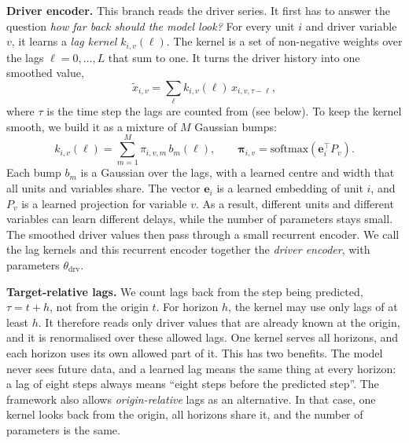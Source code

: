 \documentclass[conference]{IEEEtran}
\begin{document}
\textbf{Driver encoder.} This branch reads the driver series. It first has to answer the question \emph{how far back should the model look?} For every unit $i$ and driver variable $v$, it learns a \emph{lag kernel} $k_{i,v}(\ell)$. The kernel is a set of non-negative weights over the lags $\ell = 0, \dots, L$ that sum to one. It turns the driver history into one smoothed value,
\begin{equation}
\tilde{x}_{i,v} = \sum_{\ell} k_{i,v}(\ell)\, x_{i,v,\tau-\ell}, \label{eq:kernel}
\end{equation}
where $\tau$ is the time step the lags are counted from (see below). To keep the kernel smooth, we build it as a mixture of $M$ Gaussian bumps:
\begin{equation}
k_{i,v}(\ell) = \sum_{m=1}^{M} \pi_{i,v,m}\, b_m(\ell), \qquad
\boldsymbol{\pi}_{i,v} = \mathrm{softmax}\!\left(\mathbf{e}_i^{\top} P_v\right). \label{eq:mixture}
\end{equation}
Each bump $b_m$ is a Gaussian over the lags, with a learned centre and width that all units and variables share. The vector $\mathbf{e}_i$ is a learned embedding of unit $i$, and $P_v$ is a learned projection for variable $v$. As a result, different units and different variables can learn different delays, while the number of parameters stays small. The smoothed driver values then pass through a small recurrent encoder. We call the lag kernels and this recurrent encoder together the \emph{driver encoder}, with parameters $\theta_{\mathrm{drv}}$.

\textbf{Target-relative lags.} We count lags back from the step being predicted, $\tau = t+h$, not from the origin $t$. For horizon $h$, the kernel may use only lags of at least $h$. It therefore reads only driver values that are already known at the origin, and it is renormalised over these allowed lags. One kernel serves all horizons, and each horizon uses its own allowed part of it. This has two benefits. The model never sees future data, and a learned lag means the same thing at every horizon: a lag of eight steps always means ``eight steps before the predicted step''. The framework also allows \emph{origin-relative} lags as an alternative. In that case, one kernel looks back from the origin, all horizons share it, and the number of parameters is the same.
\end{document}
